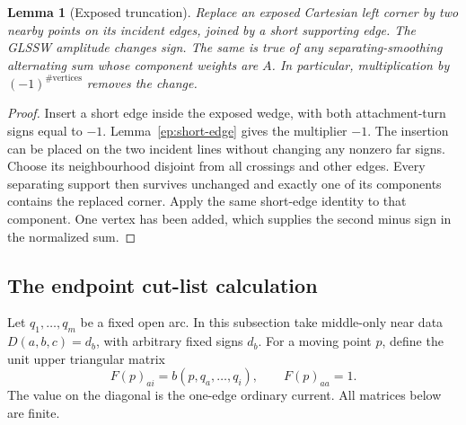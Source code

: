 \documentclass[11pt,letterpaper]{article}
\numberwithin{equation}{section}
\newtheorem{lemma}[theorem]{Lemma}
\theoremstyle{definition}
\theoremstyle{remark}
\begin{document}
\begin{lemma}[Exposed truncation]
\label{ep:truncation}
Replace an exposed Cartesian left corner by two nearby points on its
incident edges, joined by a short supporting edge.  The GLSSW amplitude
changes sign.  The same is true of any separating-smoothing alternating
sum whose component weights are $A$.  In particular, multiplication by
$(-1)^{\#\text{vertices}}$ removes the change.
\end{lemma}
\begin{proof}
Insert a short edge inside the exposed wedge, with both attachment-turn
signs equal to $-1$.  Lemma~\ref{ep:short-edge} gives the multiplier
$-1$.  The insertion can be placed on the two incident lines without
changing any nonzero far signs.  Choose its neighbourhood disjoint from
all crossings and other edges.  Every separating support then survives
unchanged and exactly one of its components contains the replaced corner.
Apply the same short-edge identity to that component.  One vertex has
been added, which supplies the second minus sign in the normalized sum.
\end{proof}

\subsection{The endpoint cut-list calculation}
\label{ep:endpoint-calculation}

Let $q_1,\ldots,q_m$ be a fixed open arc.  In this subsection take
middle-only near data $D(a,b,c)=d_b$, with arbitrary fixed signs $d_b$.
For a moving point $p$, define the unit upper triangular matrix
\begin{equation}
 F(p)_{ai}=b(p,q_a,\ldots,q_i),\qquad F(p)_{aa}=1.
 \label{ep:F}
\end{equation}
The value on the diagonal is the one-edge ordinary current.  All matrices
below are finite.
\end{document}
